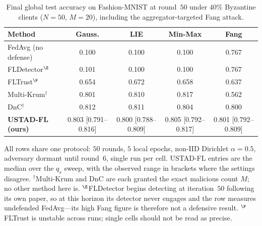 \documentclass[journal]{IEEEtran}
\begin{document}
\begin{table}[t]
\centering
\caption{Final global test accuracy on Fashion-MNIST at round~$50$ under $40\%$ Byzantine clients ($N=50$, $M=20$), including the aggregator-targeted Fang attack.}
\label{tab:acc_fashion_mnist}
\footnotesize
\setlength{\tabcolsep}{4pt}
\begin{tabular}{@{}lcccc@{}}
\toprule
\textbf{Method} & Gauss. & LIE & Min-Max & \textbf{Fang} \\
\midrule
FedAvg (no defense) & 0.100 & 0.100 & 0.100 & 0.767 \\
FLDetector$^{\S}$ & 0.101 & 0.100 & 0.100 & 0.767 \\
FLTrust$^{\P}$ & 0.654 & 0.672 & 0.658 & 0.637 \\
Multi-Krum$^\dagger$ & 0.801 & 0.810 & 0.817 & 0.562 \\
DnC$^\dagger$ & 0.812 & 0.811 & 0.804 & 0.800 \\
\textbf{USTAD-FL (ours)} & 0.803 {\scriptsize[0.791--0.816]} & 0.800 {\scriptsize[0.788--0.809]} & 0.805 {\scriptsize[0.792--0.817]} & 0.801 {\scriptsize[0.792--0.809]} \\
\bottomrule
\end{tabular}

\vspace{2pt}
{\footnotesize \raggedright All rows share one protocol: $50$ rounds, $5$ local epochs, non-IID Dirichlet $\alpha=0.5$, adversary dormant until round~$6$, single run per cell. USTAD-FL entries are the median over the $q_s$ sweep, with the observed range in brackets where the settings disagree. $^\dagger$Multi-Krum and DnC are each granted the exact malicious count $M$; no other method here is. $^{\S}$FLDetector begins detecting at iteration~$50$ following its own paper, so at this horizon its detector never engages and the row measures undefended FedAvg---its high Fang figure is therefore not a defensive result. $^{\P}$FLTrust is unstable across runs; single cells should not be read as precise.\par}
\end{table}
\end{document}
